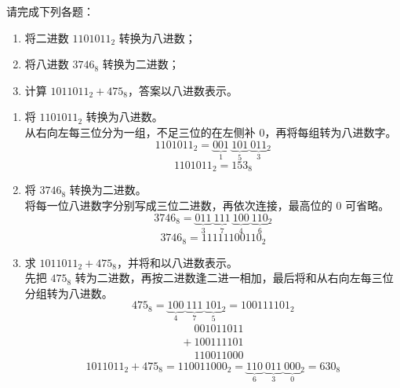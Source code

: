 \documentclass[12pt,a4paper,fontset=none]{exam-zh}
\begin{document}
\makeexamheader


\begin{question}[points = 8]
    请完成下列各题：

    \begin{enumerate}[label=(\alph*)]
        \item 将二进数 $1101011_2$ 转换为八进数；

        \item 将八进数 $3746_8$ 转换为二进数；

        \item 计算 $1011011_2 + 475_8$，答案以八进数表示。
    \end{enumerate}
\end{question}

\begin{solution}
    \begin{enumerate}[label=(\alph*)]
        \item 将 $1101011_2$ 转换为八进数。 \\
        从右向左每三位分为一组，不足三位的在左侧补 $0$，再将每组转为八进数字。 \\
        \[
            1101011_2 = \underbrace{001}_{1}\ \underbrace{101}_{5}\ \underbrace{011}_{3}{}_{2}
        \]
        \[
            1101011_2 = 153_8
        \]

        \item 将 $3746_8$ 转换为二进数。 \\
        将每一位八进数字分别写成三位二进数，再依次连接，最高位的 $0$ 可省略。 \\
        \[
            3746_8 = \underbrace{011}_{3}\ \underbrace{111}_{7}\ \underbrace{100}_{4}\ \underbrace{110}_{6}{}_{2}
        \]
        \[
            3746_8 = 11111100110_2
        \]

        \item 求 $1011011_2 + 475_8$，并将和以八进数表示。 \\
        先把 $475_8$ 转为二进数，再按二进数逢二进一相加，最后将和从右向左每三位分组转为八进数。 \\
        \[
            475_8 = \underbrace{100}_{4}\ \underbrace{111}_{7}\ \underbrace{101}_{5}{}_{2} = 100111101_2
        \]
        \[
            \begin{array}{r}
                \phantom{+\ }001011011 \\
                +\ 100111101 \\
                \hline
                \phantom{+\ }110011000
            \end{array}
        \]
        \[
            1011011_2 + 475_8 = 110011000_2 = \underbrace{110}_{6}\ \underbrace{011}_{3}\ \underbrace{000}_{0}{}_{2} = 630_8
        \]
    \end{enumerate}
\end{solution}
\end{document}
